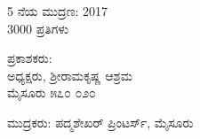 \thispagestyle{empty}

\begin{center}
5 ನೆಯ ಮುದ್ರಣ: 2017\\3000 ಪ್ರತಿಗಳು
\end{center}

\begin{center}
ಪ್ರಕಾಶಕರು: \\ಅಧ್ಯಕ್ಷರು, ಶ್ರೀರಾಮಕೃಷ್ಣ ಆಶ್ರಮ\\ಮೈಸೂರು ೫೭೦ ೦೨೦
\end{center}

\begin{center}
ಮುದ್ರಕರು: ಪದ್ಮಶೇಖರ್ ಪ್ರಿಂಟರ್ಸ್, ಮೈಸೂರು
\end{center}

